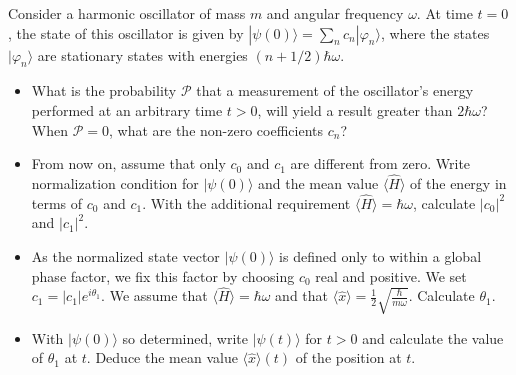 \documentclass[12pt,a4paper]{article}
\newenvironment{problem}[2][Problem]{\begin{trivlist}
\item[\hskip \labelsep {\bfseries #1}\hskip \labelsep {\bfseries #2.}]}{\end{trivlist}}
\begin{document}
\begin{problem}{1}
[C-T Exercise 5-1] Consider a harmonic oscillator of mass $m$ and angular frequency $\omega$. At time $t=0$, the state of this oscillator is given by $|\psi(0)\rangle=\sum_nc_n|\varphi_n\rangle$, where the states $|\varphi_n\rangle$ are stationary states with energies $(n+1/2)\hbar\omega$.
\begin{itemize}
\item[(a)] What is the probability $\mathcal{P}$ that a measurement of the oscillator's energy performed at an arbitrary time $t>0$, will yield a result greater than $2\hbar\omega$? When $\mathcal{P}=0$, what are the non-zero coefficients $c_n$?
\item[(b)] From now on, assume that only $c_0$ and $c_1$ are different from zero. Write normalization condition for $|\psi(0)\rangle$ and the mean value $\langle\hat{H}\rangle$ of the energy in terms of $c_0$ and $c_1$. With the additional requirement $\langle\hat{H}\rangle=\hbar\omega$, calculate $|c_0|^2$ and $|c_1|^2$.
\item[(c)] As the normalized state vector $|\psi(0)\rangle$ is defined only to within a global phase factor, we fix this factor by choosing $c_0$ real and positive. We set $c_1=|c_1|e^{i\theta_1}$. We assume that $\langle\hat{H}\rangle=\hbar\omega$ and that $\langle\hat{x}\rangle=\frac{1}{2}\sqrt{\frac{\hbar}{m\omega}}$. Calculate $\theta_1$.
\item[(d)] With $|\psi(0)\rangle$ so determined, write $|\psi(t)\rangle$ for $t>0$ and calculate the value of $\theta_1$ at $t$. Deduce the mean value $\langle\hat{x}\rangle(t)$ of the position at $t$.
\end{itemize}
\end{problem}
\end{document}
